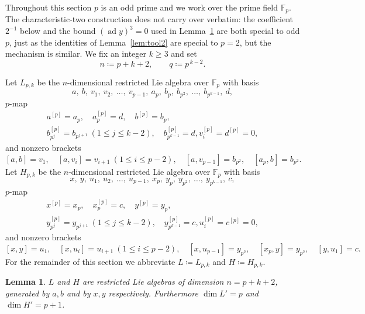 \documentclass[11pt,reqno]{amsart}
\theoremstyle{plain}
\newtheorem{lemma}[theorem]{Lemma}
\theoremstyle{remark}
\newcommand{\Fp}{\mathbb{F}_p}
\newcommand{\ad}{\operatorname{ad}}
\begin{document}
Throughout this section $p$ is an odd prime and we work over the prime field
$\Fp$. The characteristic-two construction does not carry over verbatim:
the coefficient $2^{-1}$ below and the bound $(\ad y)^3=0$ used in
Lemma~\ref{lem:validp} are both special to odd $p$, just as the identities of
Lemma~\ref{lem:tool2} are special to $p=2$, but the mechanism is similar. We fix an integer $k\ge3$
and set
\[
n\coloneqq p+k+2,\qquad q\coloneqq p^{\,k-2}.
\]

Let $L_{p,k}$ be the $n$-dimensional restricted Lie algebra over $\Fp$ with
basis
\[
a,\ b,\ v_1,\ v_2,\ \dots,\ v_{p-1},\ a_p,\ b_p,\ b_{p^2},\ \dots,\
b_{p^{k-1}},\ d,
\]
$p$-map
\begin{gather*}
a^{[p]}=a_p,\quad a_p^{[p]}=d,\quad
b^{[p]}=b_p, \\ b_{p^j}^{[p]}=b_{p^{j+1}}\ (1\le j\le k-2), \quad
b_{p^{k-1}}^{[p]}=d, v_i^{[p]}=d^{[p]}=0,
\end{gather*}
and nonzero brackets
\[
[a,b]=v_1,\quad [a,v_i]=v_{i+1}\ (1\le i\le p-2),\quad
[a,v_{p-1}]=b_{p^2},\quad [a_p,b]=b_{p^2}.
\]
Let $H_{p,k}$ be the $n$-dimensional restricted Lie algebra over $\Fp$ with
basis
\[
x,\ y,\ u_1,\ u_2,\ \dots,\ u_{p-1},\ x_p,\ y_p,\ y_{p^2},\ \dots,\
y_{p^{k-1}},\ c,
\]
$p$-map
\begin{gather*}
x^{[p]}=x_p,\quad x_p^{[p]}=c,\quad
y^{[p]}=y_p, \\ y_{p^j}^{[p]}=y_{p^{j+1}}\ (1\le j\le k-2),\quad
y_{p^{k-1}}^{[p]}=c, u_i^{[p]}=c^{[p]}=0,
\end{gather*}
and nonzero brackets
\[
[x,y]=u_1,\quad [x,u_i]=u_{i+1}\ (1\le i\le p-2),\quad
[x,u_{p-1}]=y_{p^2},\quad [x_p,y]=y_{p^2},\quad [y,u_1]=c .
\]
For the remainder of this section we abbreviate $L\coloneqq L_{p,k}$ and
$H\coloneqq H_{p,k}$.

\begin{lemma}\label{lem:validp}
$L$ and $H$ are restricted Lie algebras of dimension $n=p+k+2$, generated by
$a,b$ and by $x,y$ respectively. Furthermore $\dim L'=p$ and
$\dim H'=p+1$.
\end{lemma}
\end{document}
